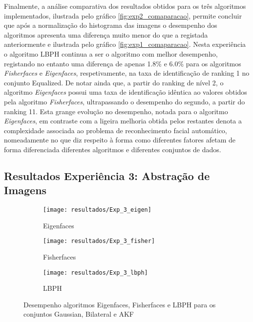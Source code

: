 Finalmente, a análise comparativa dos resultados obtidos para os três algoritmos implementados, ilustrada pelo gráfico \ref{fig:exp2_comaparacao}, permite concluir que após a normalização do histograma das imagens o desempenho dos algoritmos apresenta uma diferença muito menor do que a registada anteriormente e ilustrada pelo gráfico \ref{fig:exp1_comaparacao}. Nesta experiência o algoritmo LBPH continua a ser o algoritmo com melhor desempenho, registando no entanto uma diferença de apenas 1.8\% e 6.0\% para os algoritmos \textit{Fisherfaces} e \textit{Eigenfaces}, respetivamente, na taxa de identificação de ranking 1 no conjunto Equalized. De notar ainda que, a partir do ranking de nível 2, o algoritmo  \textit{Eigenfaces} possui uma taxa de identificação idêntica ao valores obtidos pela algoritmo \textit{Fisherfaces}, ultrapassando o desempenho do segundo, a partir do ranking 11. Esta grange evolução no desempenho, notada para o algoritmo \textit{Eigenfaces}, em contraste com a ligeira melhoria obtida pelos restantes denota a complexidade associada ao problema de reconhecimento facial automático, nomeadamente no que diz respeito à forma como diferentes fatores afetam de forma diferenciada diferentes algoritmos e diferentes conjuntos de dados.

\subsection{Resultados Experiência 3: Abstração de Imagens}
\begin{figure}[p]
        \centering
        \begin{subfigure}[b]{0.58\textwidth}
                \centering
                \texttt{[image: resultados/Exp\_3\_eigen]}
                \caption{Eigenfaces}
                \label{fig:exp3_eigen}
        \end{subfigure}%

        \begin{subfigure}[b]{0.58\textwidth}
                \centering
                \texttt{[image: resultados/Exp\_3\_fisher]}
                \caption{Fisherfaces}
                \label{fig:exp3_fisher}
        \end{subfigure}

        \begin{subfigure}[b]{0.58\textwidth}
                \centering
                \texttt{[image: resultados/Exp\_3\_lbph]}
                \caption{LBPH}
                \label{fig:exp3_lbph}
        \end{subfigure}
        \caption{Desempenho algoritmos Eigenfaces, Fisherfaces e LBPH para os conjuntos Gaussian, Bilateral e AKF}
        \label{fig:exp3}
\end{figure}

